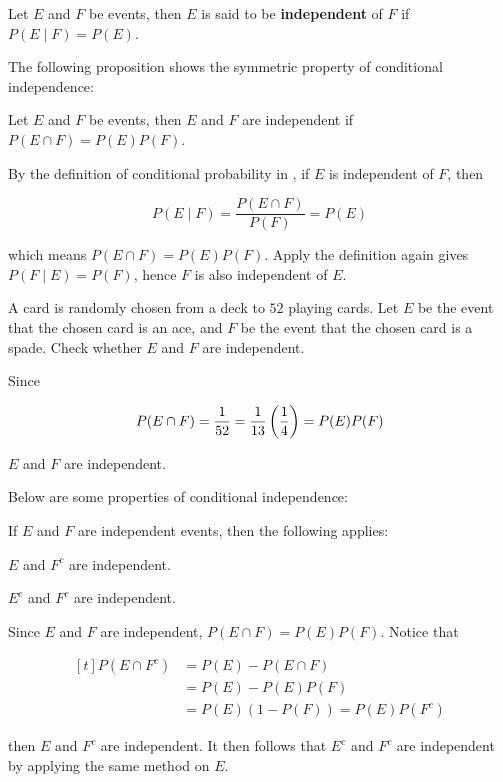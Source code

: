 \documentclass[a4paper,12pt]{article}
\begin{document}
\begin{dft}
  Let $E$ and $F$ be events, then $E$ is said to be \textbf{independent} of $F$ if $P(E\mid F)=P(E)$.
\end{dft}\n

The following proposition shows the symmetric property of conditional independence:\n

\begin{pst}
  Let $E$ and $F$ be events, then $E$ and $F$ are independent if $P(E\cap F)=P(E)P(F)$.\n

  \prf By the definition of conditional probability in \rdft[\sctr{8}], if $E$ is independent of $F$, then

  $$P(E\mid F)=\frac{P(E\cap F)}{P(F)}=P(E)$$\s
  
  which means $P(E\cap F)=P(E)P(F)$. Apply the definition again gives $P(F\mid E)=P(F)$, hence $F$ is also independent of $E$.
\end{pst}\n

\begin{exm}
  A card is randomly chosen from a deck to $52$ playing cards. Let $E$ be the event that the chosen card is an ace, and $F$ be the event that the chosen card is a spade. Check whether $E$ and $F$ are independent.\n

  \ans Since

  $$P(E\cap F)=\frac{1}{52}=\frac{1}{13}\left( \frac{1}{4}\right)=P(E)P(F)$$\s

  $E$ and $F$ are independent.
\end{exm}\n

Below are some properties of conditional independence:\n

\begin{pst}
  If $E$ and $F$ are independent events, then the following applies:
  
  \begin{alist}
    \item $E$ and $F^{c}$ are independent.
    \item $E^{c}$ and $F^{c}$ are independent.
  \end{alist}

  \prf Since $E$ and $F$ are independent, $P(E\cap F)=P(E)P(F)$. Notice that

  $$\begin{aligned}[t]
    P(E\cap F^{c})&=P(E)-P(E\cap F)\\
    &=P(E)-P(E)P(F)\\
    &=P(E)(1-P(F))=P(E)P(F^{c})
  \end{aligned}$$\s

  then $E$ and $F^{c}$ are independent. It then follows that $E^{c}$ and $F^{c}$ are independent by applying the same method on $E$.
\end{pst}\n
\end{document}
